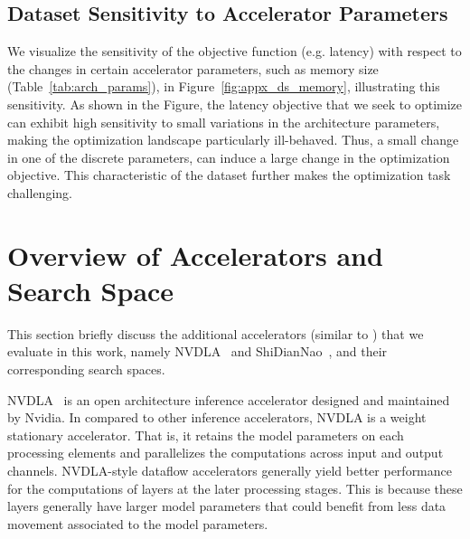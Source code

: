 \subsection{Dataset Sensitivity to Accelerator Parameters}
\label{sec:app_ds_sensitivity}
%
We visualize the sensitivity of the objective function (e.g. latency) with respect to the changes in certain accelerator parameters, such as memory size (Table~\ref{tab:arch_params}), in Figure~\ref{fig:appx_ds_memory}, illustrating this sensitivity.
%
As shown in the Figure, the latency objective that we seek to optimize can exhibit high sensitivity to small variations in the architecture parameters, making the optimization landscape particularly ill-behaved.
%
Thus, a small change in one of the discrete parameters, can induce a large change in the optimization objective.
%
This characteristic of the dataset further makes the optimization task challenging. 


\section{Overview of Accelerators and Search Space}
\label{sec:dla_shi_fast}
%
This section briefly discuss the additional accelerators (similar to \citep{kao2020confuciux}) that we evaluate in this work, namely NVDLA~\citep{nvidia} and ShiDianNao~\citep{shidiannao}, and their corresponding search spaces.

%
NVDLA~\citep{nvdla} is an open architecture inference accelerator designed and maintained by Nvidia.
%
In compared to other inference accelerators, NVDLA is a weight stationary accelerator. That is, it retains the model parameters on each processing elements and parallelizes the computations across input and output channels.
%
NVDLA-style dataflow accelerators generally yield better performance for the computations of layers at the later processing stages. This is because these layers generally have larger model parameters that could benefit from less data movement associated to the model parameters.

